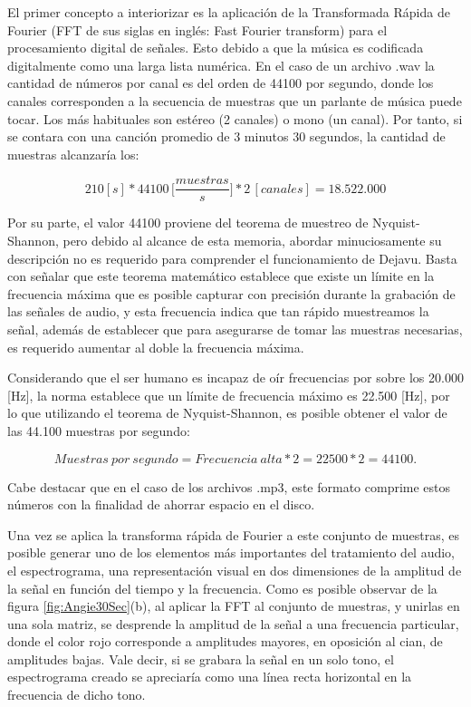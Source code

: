 El primer concepto a interiorizar es la aplicación de la Transformada Rápida de Fourier (FFT de sus siglas en inglés: Fast Fourier transform) para el procesamiento digital de señales. Esto debido a que la música es codificada digitalmente como una larga lista numérica. En el caso de un archivo .wav la cantidad de números por canal es del orden de 44100 por segundo, donde los canales corresponden a la secuencia de muestras que un parlante de música puede tocar. Los más habituales son estéreo (2 canales) o mono (un canal). Por tanto, si se contara con una canción promedio de 3 minutos 30 segundos, la cantidad de muestras alcanzaría los:

\begin{equation*}
210 [s]* 44100 \, \bigg[ \frac{muestras}{s} \bigg] *2 \, [canales] = 18.522.000
\end{equation*}

Por su parte, el valor 44100 proviene del teorema de muestreo de Nyquist-Shannon, pero debido al alcance de esta memoria, abordar minuciosamente su descripción no es requerido para comprender el funcionamiento de Dejavu. Basta con señalar que este teorema matemático establece que existe un límite en la frecuencia máxima que es posible capturar con precisión durante la grabación de las señales de audio, y esta frecuencia indica que tan rápido muestreamos la señal, además de establecer que para asegurarse de tomar las muestras necesarias, es requerido aumentar al doble la frecuencia máxima. 



Considerando que el ser humano es incapaz de oír frecuencias por sobre los 20.000 [Hz], la norma establece que un límite de frecuencia máximo es 22.500 [Hz], por lo que utilizando el teorema de Nyquist-Shannon, es posible obtener el valor de las 44.100 muestras por segundo:

\begin{equation*}
Muestras \: por \: segundo = Frecuencia \:  alta * 2 = 22500*2 = 44100.
\end{equation*}

Cabe destacar que en el caso de los archivos .mp3, este formato comprime estos números con la finalidad de ahorrar espacio en el disco.



Una vez se aplica la transforma rápida de Fourier a este conjunto de muestras, es posible generar uno de los elementos más importantes del tratamiento del audio, el espectrograma, una representación visual en dos dimensiones de la amplitud de la señal en función del tiempo y la frecuencia. Como es posible observar de la figura \ref{fig:Angie30Sec}(b), al aplicar la FFT al conjunto de muestras, y unirlas en una sola matriz, se desprende la amplitud de la señal a una frecuencia particular, donde el color rojo corresponde a amplitudes mayores, en oposición al cian, de amplitudes bajas. Vale decir, si se grabara la señal en un solo tono, el espectrograma creado se apreciaría como una línea recta horizontal en la frecuencia de dicho tono.


